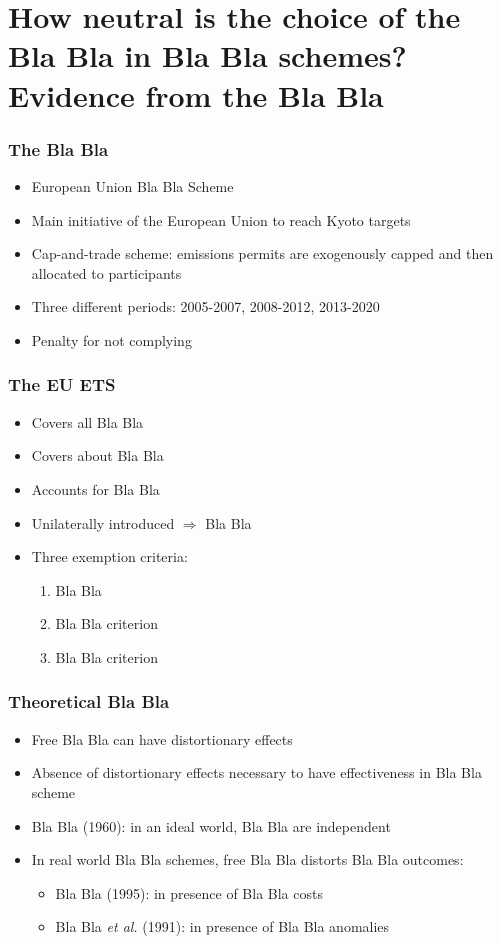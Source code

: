 \documentclass{beamer}
\begin{document}
\section[Neutrality of Bla Bla]{How neutral is the choice of the Bla Bla in Bla Bla schemes? Evidence from the Bla Bla}
\setcounter{subsection}{1}

\begin{frame}
\frametitle{The Bla Bla}
\begin{itemize}
\item European Union Bla Bla Scheme
\item Main initiative of the European Union to reach Kyoto targets
\item Cap-and-trade scheme: emissions permits are exogenously capped and then allocated to participants
\item Three different periods: 2005-2007, 2008-2012, 2013-2020
\item Penalty for not complying
\end{itemize}
\end{frame}

\begin{frame}
\frametitle{The EU ETS}
\begin{itemize}
\item Covers all Bla Bla
\item Covers about Bla Bla
\item Accounts for Bla Bla
\item Unilaterally introduced $\Rightarrow$ Bla Bla
\item Three exemption criteria:
\begin{enumerate}
\item Bla Bla
\item Bla Bla criterion
\item Bla Bla criterion
\end{enumerate}
\end{itemize}
\end{frame}

\begin{frame}
\frametitle{Theoretical Bla Bla}
\begin{itemize}
\item Free Bla Bla can have distortionary effects
\item Absence of distortionary effects necessary to have effectiveness in Bla Bla scheme
\item Bla Bla (1960): in an ideal world, Bla Bla are independent
\item In real world Bla Bla schemes, free Bla Bla distorts Bla Bla outcomes:
\begin{itemize}
\item Bla Bla (1995): in presence of Bla Bla costs
\item Bla Bla \textit{et al.} (1991): in presence of Bla Bla anomalies
\end{itemize}
\end{itemize}
\end{frame}
\end{document}
